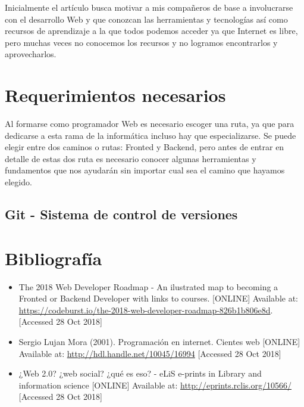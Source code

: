 \documentclass[a4paper]{article}
\begin{document}
Inicialmente el artículo busca motivar a mis compañeros de base a involucrarse
con el desarrollo Web y que conozcan las herramientas y tecnologías así como
recursos de aprendizaje a la que todos podemos acceder ya que Internet es
libre, pero muchas veces no conocemos los recursos y no logramos encontrarlos y
aprovecharlos.

\section{Requerimientos necesarios}
Al formarse como programador Web es necesario escoger una ruta, ya que para
dedicarse a esta rama de la informática incluso hay que especializarse. Se
puede elegir entre dos caminos o rutas: Fronted y Backend, pero antes de entrar
en detalle de estas dos ruta es necesario conocer algunas herramientas y
fundamentos que nos ayudarán sin importar cual sea el camino que hayamos
elegido.
\subsection{Git - Sistema de control de versiones}



\newpage
\section{Bibliografía }

\begin{itemize}
   \item The 2018 Web Developer Roadmap - An ilustrated map to becoming a
      Fronted or Backend Developer with links to courses. [ONLINE] Available
      at: \url{https://codeburst.io/the-2018-web-developer-roadmap-826b1b806e8d}.
      [Accessed 28 Oct 2018]
\end{itemize}

\begin{itemize}
   \item Sergio Lujan Mora (2001). Programación en internet. Cientes web [ONLINE] Available
      at: \url{http://hdl.handle.net/10045/16994}
      [Accessed 28 Oct 2018]
\end{itemize}

\begin{itemize}
   \item ¿Web 2.0? ¿web social? ¿qué es eso? - eLiS e-prints in Library and
      information science [ONLINE] Available at:
      \url{http://eprints.rclis.org/10566/} [Accessed 28 Oct 2018]
\end{itemize}
\end{document}
